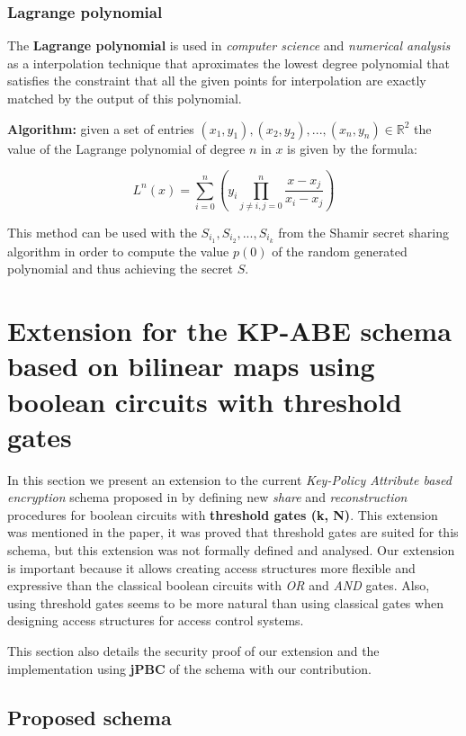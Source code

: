 \documentclass[12pt]{article}
\begin{document}
\subsubsection{Lagrange polynomial}

The \textbf{Lagrange polynomial} is used in \textit{computer science} and \textit{numerical analysis} as a interpolation technique that aproximates the lowest degree polynomial that satisfies the constraint that all the given points for interpolation are exactly matched by the output of this polynomial.

\textbf{Algorithm:} given a set of entries $(x_1, y_1), (x_2, y_2), ..., (x_n, y_n) \in \mathbb{R}^2$ the value of the Lagrange polynomial of degree $n$ in $x$ is given by the formula:

$$L^n(x) = \sum_{i = 0}^n(y_i\prod_{j \neq i, j = 0}^n \frac{x - x_j}{x_i - x_j})$$

This method can be used with the $S_{i_1}, S_{i_2}, ..., S_{i_k}$ from the Shamir secret sharing algorithm in order to compute the value $p(0)$ of the random generated polynomial and thus achieving the secret $S$.

\section{Extension for the KP-ABE schema based on bilinear maps using boolean circuits with threshold gates}

In this section we present an extension to the current \textit{Key-Policy Attribute based encryption} schema proposed in \cite{fltccd} by defining new \textit{share} and \textit{reconstruction} procedures for boolean circuits with \textbf{threshold gates (k, N)}. This extension was mentioned in the \cite{fltccd} paper, it was proved that threshold gates are suited for this schema, but this extension was not formally defined and analysed. Our extension is important because it allows creating access structures more flexible and expressive than the classical boolean circuits with \textit{OR} and \textit{AND} gates. Also, using threshold gates seems to be more natural than using classical gates when designing access structures for access control systems.

This section also details the security proof of our extension and the implementation using \textbf{jPBC} of the \cite{fltccd} schema with our contribution. 

\subsection{Proposed schema}
\end{document}
